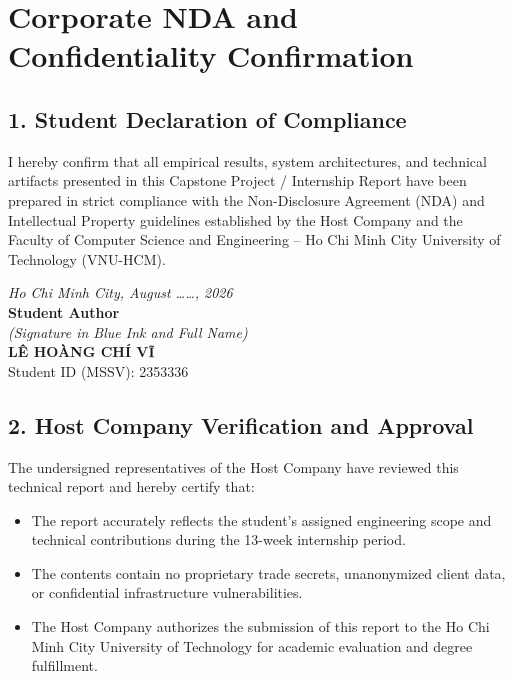\chapter*{Corporate NDA and Confidentiality Confirmation}

\section*{1. Student Declaration of Compliance}
I hereby confirm that all empirical results, system architectures, and technical artifacts presented in this Capstone Project / Internship Report have been prepared in strict compliance with the Non-Disclosure Agreement (NDA) and Intellectual Property guidelines established by the Host Company and the Faculty of Computer Science and Engineering -- Ho Chi Minh City University of Technology (VNU-HCM).

\vspace{0.8cm}
\begin{flushright}
\begin{minipage}{0.5\textwidth}
\centering
\textit{Ho Chi Minh City, August \dots\dots, 2026}\\[0.2cm]
\textbf{Student Author}\\[0.1cm]
\textit{(Signature in Blue Ink and Full Name)}\\[2.8cm]
\textbf{LÊ HOÀNG CHÍ VĨ}\\
Student ID (MSSV): 2353336
\end{minipage}
\end{flushright}

\vspace{1.0cm}

\section*{2. Host Company Verification and Approval}
The undersigned representatives of the Host Company have reviewed this technical report and hereby certify that:
\begin{itemize}[leftmargin=1.5cm, label=--]
  \item The report accurately reflects the student's assigned engineering scope and technical contributions during the 13-week internship period.
  \item The contents contain no proprietary trade secrets, unanonymized client data, or confidential infrastructure vulnerabilities.
  \item The Host Company authorizes the submission of this report to the Ho Chi Minh City University of Technology for academic evaluation and degree fulfillment.
\end{itemize}

